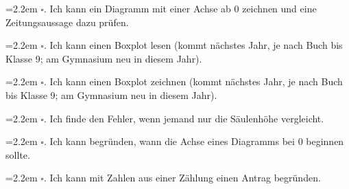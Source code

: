\noindent\hangindent=2.2em $\square$. Ich kann ein Diagramm mit einer Achse ab 0 zeichnen und eine Zeitungsaussage dazu prüfen.\par
\noindent\hangindent=2.2em $\square$. Ich kann einen Boxplot lesen (kommt nächstes Jahr, je nach Buch bis Klasse 9; am Gymnasium neu in diesem Jahr).\par
\noindent\hangindent=2.2em $\square$. Ich kann einen Boxplot zeichnen (kommt nächstes Jahr, je nach Buch bis Klasse 9; am Gymnasium neu in diesem Jahr).\par
\noindent\hangindent=2.2em $\square$. Ich finde den Fehler, wenn jemand nur die Säulenhöhe vergleicht.\par
\noindent\hangindent=2.2em $\square$. Ich kann begründen, wann die Achse eines Diagramms bei 0 beginnen sollte.\par
\noindent\hangindent=2.2em $\square$. Ich kann mit Zahlen aus einer Zählung einen Antrag begründen.\par
\endgroup
